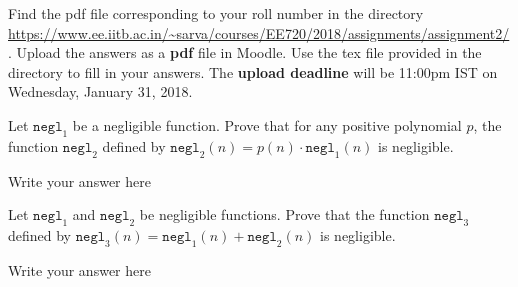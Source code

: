 \documentclass[12pt,a4paper,answers]{exam}
\begin{document}
\pagestyle{head}
\headrule
{}
%

\extraheadheight{.4in}%
\extrafootheight{-0.5in}%
\extrawidth{0.5in}%

Find the pdf file corresponding to your roll number in the directory \url{https://www.ee.iitb.ac.in/~sarva/courses/EE720/2018/assignments/assignment2/}. Upload the answers as a \textbf{pdf} file in Moodle. Use the tex file provided in the directory to fill in your answers. The \textbf{upload deadline} will be 11:00pm IST on Wednesday, January 31, 2018.
\begin{questions}
\question[5] Let $\texttt{negl}_1$ be a negligible function. Prove that for any positive polynomial $p$, the function $\texttt{negl}_2$ defined by $\texttt{negl}_2(n) = p(n) \cdot \texttt{negl}_1(n)$ is negligible.
  \begin{solution}
    Write your answer here
  \end{solution}
 
\question[5] Let $\texttt{negl}_1$ and $\texttt{negl}_2$ be negligible functions. Prove that the function $\texttt{negl}_3$ defined by $\texttt{negl}_3(n) = \texttt{negl}_1(n) + \texttt{negl}_2(n)$ is negligible.
  \begin{solution}
    Write your answer here
  \end{solution}

  
\end{questions}
\end{document}
